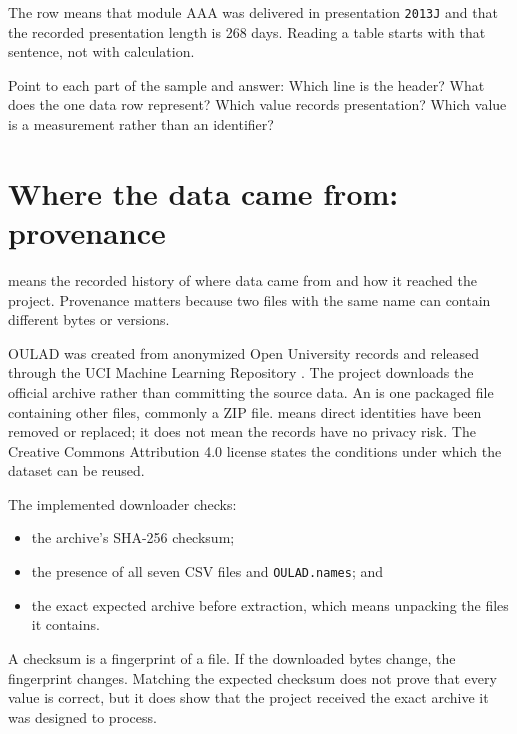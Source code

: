 The row means that module AAA was delivered in presentation \texttt{2013J} and that the
recorded presentation length is 268 days. Reading a table starts with that
sentence, not with calculation.

\begin{validationbox}
Point to each part of the sample and answer: Which line is the header? What does
the one data row represent? Which value records presentation? Which value is a
measurement rather than an identifier?
\end{validationbox}

\section{Where the data came from: provenance}

 means the recorded history of where data came from and how it
reached the project. Provenance matters because two files with the same name
can contain different bytes or versions.

OULAD was created from anonymized Open University records and released through
the UCI Machine Learning Repository \citep{oulad_dataset,oulad_paper}. The
project downloads the official archive rather than committing the source data.
An  is one packaged file containing other files, commonly a ZIP
file.  means direct identities have been removed or replaced;
it does not mean the records have no privacy risk. The Creative Commons
Attribution 4.0 license states the conditions under which the dataset can be
reused.

The implemented downloader checks:
\begin{itemize}
  \item the archive's SHA-256 checksum;
  \item the presence of all seven CSV files and \texttt{OULAD.names}; and
  \item the exact expected archive before extraction, which means unpacking the
    files it contains.
\end{itemize}

\begin{plainlanguage}
A checksum is a fingerprint of a file. If the downloaded bytes change, the
fingerprint changes. Matching the expected checksum does not prove that every
value is correct, but it does show that the project received the exact archive
it was designed to process.
\end{plainlanguage}

